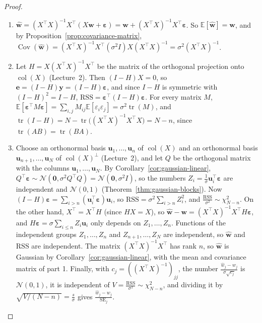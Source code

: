 \documentclass[11pt]{article}
\newcommand{\E}{\mathbb{E}}
\DeclareMathOperator{\Cov}{Cov}
\theoremstyle{definition}
\theoremstyle{plain}
\theoremstyle{remark}
\DeclareMathOperator{\col}{col}
\DeclareMathOperator{\tr}{tr}
\begin{document}
\begin{proof}
    \begin{enumerate}
        \item $\hat{\mathbf{w}} = (X^\top X)^{-1}X^\top(X\mathbf{w} + \boldsymbol{\varepsilon}) = \mathbf{w} + (X^\top X)^{-1}X^\top\boldsymbol{\varepsilon}$. So $\E[\hat{\mathbf{w}}] = \mathbf{w}$, and by Proposition~\ref{prop:covariance-matrix}, $\Cov(\hat{\mathbf{w}}) = (X^\top X)^{-1}X^\top(\sigma^2I)X(X^\top X)^{-1} = \sigma^2(X^\top X)^{-1}$.
        \item Let $H = X(X^\top X)^{-1}X^\top$ be the matrix of the orthogonal projection onto $\col(X)$ (Lecture~2). Then $(I - H)X = 0$, so $\mathbf{e} = (I - H)\mathbf{y} = (I - H)\boldsymbol{\varepsilon}$, and since $I - H$ is symmetric with $(I - H)^2 = I - H$, $\mathrm{RSS} = \boldsymbol{\varepsilon}^\top(I - H)\boldsymbol{\varepsilon}$. For every matrix $M$, $\E[\boldsymbol{\varepsilon}^\top M\boldsymbol{\varepsilon}] = \sum_{i,j}M_{ij}\E[\varepsilon_i\varepsilon_j] = \sigma^2\tr(M)$, and $\tr(I - H) = N - \tr\big((X^\top X)^{-1}X^\top X\big) = N - n$, since $\tr(AB) = \tr(BA)$.
        \item Choose an orthonormal basis $\mathbf{u}_1, \ldots, \mathbf{u}_n$ of $\col(X)$ and an orthonormal basis $\mathbf{u}_{n+1}, \ldots, \mathbf{u}_N$ of $\col(X)^\perp$ (Lecture~2), and let $Q$ be the orthogonal matrix with the columns $\mathbf{u}_1, \ldots, \mathbf{u}_N$. By Corollary~\ref{cor:gaussian-linear}, $Q^\top\boldsymbol{\varepsilon} \sim \mathcal{N}(\mathbf{0}, \sigma^2Q^\top Q) = \mathcal{N}(\mathbf{0}, \sigma^2I)$, so the numbers $Z_i = \frac{1}{\sigma}\mathbf{u}_i^\top\boldsymbol{\varepsilon}$ are independent and $\mathcal{N}(0, 1)$ (Theorem~\ref{thm:gaussian-blocks}). Now $(I - H)\boldsymbol{\varepsilon} = \sum_{i > n}(\mathbf{u}_i^\top\boldsymbol{\varepsilon})\mathbf{u}_i$, so $\mathrm{RSS} = \sigma^2\sum_{i > n}Z_i^2$, and $\frac{\mathrm{RSS}}{\sigma^2} \sim \chi^2_{N-n}$. On the other hand, $X^\top = X^\top H$ (since $HX = X$), so $\hat{\mathbf{w}} - \mathbf{w} = (X^\top X)^{-1}X^\top H\boldsymbol{\varepsilon}$, and $H\boldsymbol{\varepsilon} = \sigma\sum_{i \leq n}Z_i\mathbf{u}_i$ only depends on $Z_1, \ldots, Z_n$. Functions of the independent groups $Z_1, \ldots, Z_n$ and $Z_{n+1}, \ldots, Z_N$ are independent, so $\hat{\mathbf{w}}$ and $\mathrm{RSS}$ are independent. The matrix $(X^\top X)^{-1}X^\top$ has rank $n$, so $\hat{\mathbf{w}}$ is Gaussian by Corollary~\ref{cor:gaussian-linear}, with the mean and covariance matrix of part 1. Finally, with $c_j = ((X^\top X)^{-1})_{jj}$, the number $\frac{\hat w_j - w_j}{\sigma\sqrt{c_j}}$ is $\mathcal{N}(0, 1)$, it is independent of $V = \frac{\mathrm{RSS}}{\sigma^2} \sim \chi^2_{N-n}$, and dividing it by $\sqrt{V/(N - n)} = \frac{s}{\sigma}$ gives $\frac{\hat w_j - w_j}{\mathrm{SE}_j}$. \qedhere
    \end{enumerate}
\end{proof}
\end{document}
